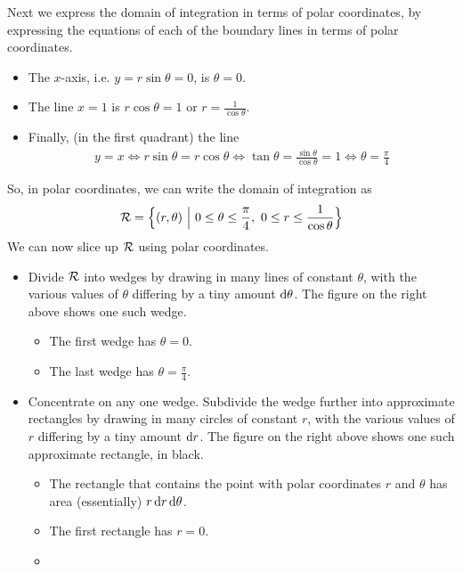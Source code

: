 {\begin{eg}
Next we express the domain of integration in terms of polar coordinates,
by expressing the equations of each of the boundary lines in terms of
polar coordinates.
\begin{itemize}
\item 
The $x$-axis, i.e. $y=r\sin\theta=0$, is $\theta=0$.
\item 
The line $x=1$ is $r\cos\theta=1$ or $r=\frac{1}{\cos\theta}$.
\item
Finally, (in the first quadrant)  the line
\begin{align*}
y=x
\iff
r\sin\theta = r\cos\theta
\iff
\tan\theta=\frac{\sin\theta}{\cos\theta}=1
\iff
\theta=\frac{\pi}{4}
\end{align*}
\end{itemize}
So, in polar coordinates, we can write the domain of integration as
\begin{equation*}
\cR=\Big\{(r,\theta)\ \Big|\ 0\le\theta\le\frac{\pi}{4},\ 
             0\le r\le \frac{1}{\cos\theta}\Big\}
\end{equation*}
We can now slice up $\mathcal{R}$ using polar coordinates.
\begin{itemize}
\item
Divide $\mathcal{R}$ into wedges by drawing in many lines of constant 
$\theta$, with the various values of $\theta$ differing by a tiny 
amount $\mathrm{d}\theta$. The figure on the right above shows one such wedge.
\vspace{-\topsep}
\begin{itemize} \itemsep1pt \parskip0pt 
\item
The first wedge has $\theta=0$.
\item
The last wedge has $\theta=\frac{\pi}{4}$.
\end{itemize}
\vspace{-\topsep}
\item
Concentrate on any one wedge. Subdivide the wedge further into
approximate rectangles by drawing in many circles of constant $r$, 
with the various values of $r$ differing by a tiny amount $\mathrm{d}r$.
The figure on the right above shows one such approximate rectangle, in black.
\vspace{-\topsep}
\begin{itemize} \itemsep1pt \parskip0pt 
\item
The rectangle that contains the point with polar coordinates $r$ and 
$\theta$ has area (essentially) $r\,\mathrm{d}r\,\mathrm{d}\theta$.
\item
The first rectangle has $r=0$.
\item

\end{itemize}
\end{itemize}
\end{eg}}
